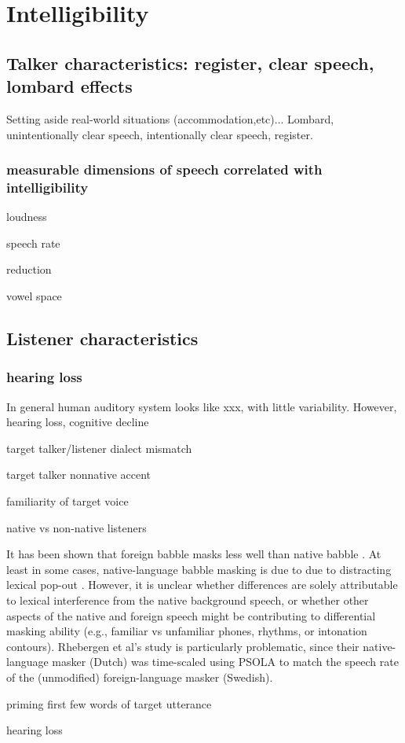 \section{Intelligibility}

\subsection{Talker characteristics: register, clear speech, lombard effects}
Setting aside real-world situations (accommodation,etc)...  Lombard, unintentionally clear speech, intentionally clear speech, register.

\subsubsection{measurable dimensions of speech correlated with intelligibility}
\begin{itm}
	\item{loudness}
	\item{speech rate}
	\item{reduction}
	\item{vowel space}
\end{itm}

\subsection{Listener characteristics}
\subsubsection{hearing loss}
In general human auditory system looks like xxx, with little variability.  However, hearing loss, cognitive decline

\begin{itm}
	\item{target talker/listener dialect mismatch}
	\item{target talker nonnative accent}
	\item{familiarity of target voice}
	\item{native vs non-native listeners \citep{CookeEtAl2008, CookeEtAl2010, BrouwerEtAl2012}}
	\item{It has been shown that foreign babble masks less well than native babble \citep{RhebergenEtAl2005,VanEngenBradlow2007,WuEtAl2011}.  At least in some cases, native-language babble masking is due to due to distracting lexical pop-out \citep{HoenEtAl2007}.  However, it is unclear whether differences are solely attributable to lexical interference from the native background speech, or whether other aspects of the native and foreign speech might be contributing to differential masking ability (e.g., familiar vs unfamiliar phones, rhythms, or intonation contours). Rhebergen et al's study is particularly problematic, since their native-language masker (Dutch) was time-scaled using PSOLA to match the speech rate of the (unmodified) foreign-language masker (Swedish).}
	\item{priming first few words of target utterance \citep{FreymanEtAl2004}}
	\item{hearing loss}
\end{itm}

